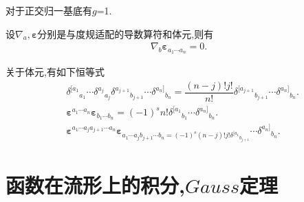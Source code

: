 \begin{remark}
    对于正交归一基底有$g$=1.
\end{remark}
设$\nabla_a,\boldsymbol{\varepsilon}$分别是与度规适配的导数算符和体元,则有
\begin{align}
\nabla_b\boldsymbol{\varepsilon}_{a_1\cdots a_n}=0.
\end{align}

关于体元,有如下恒等式
\begin{align}
    &\delta^{[a_1}{}_{a_1}\cdots \delta^{a_j}{}_{a_j}\delta^{a_{j+1}}{}_{b_{j+1}}\cdots \delta^{a_n]}{}_{b_n}=\dfrac{(n-j)!j!}{n!}\delta^{[a_{j+1}}{}_{b_{j+1}}\cdots \delta^{a_n]}{}_{b_n}.\\
    &\boldsymbol{\varepsilon}^{a_1\cdots a_n}\boldsymbol{\varepsilon}_{b_1\cdots b_n}=(-1)^sn!\delta^{[a_1}{}_{b_1}\cdots\delta^{a_n]}{}_{b_n}.\\
    &\boldsymbol{\varepsilon}^{a_1\cdots a_ja_{j+1}\cdots a_n}\boldsymbol{\varepsilon}_{a_1\cdots a_j b_{j+1}\cdots b_n=(-1)^s(n-j)!j!\delta^{[a_1}{}_{b_{j+1}}}\cdots \delta^{a_n]}{}_{b_n}.
\end{align}

\section{函数在流形上的积分,$Gauss$定理}

